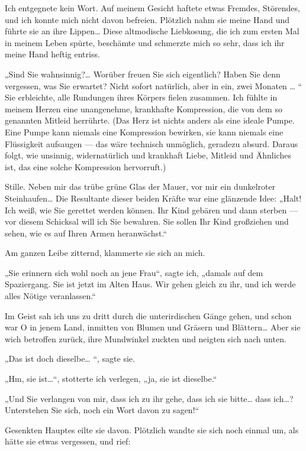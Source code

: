 Ich entgegnete kein Wort. Auf meinem Gesicht haftete etwas Fremdes,
Störendes, und ich konnte mich nicht davon befreien. Plötzlich nahm
sie meine Hand und führte sie an ihre Lippen\ldots{} Diese altmodische
Liebkosung, die ich zum ersten Mal in meinem Leben spürte,
beschämte und schmerzte mich so sehr, dass ich ihr meine Hand
heftig entriss.

„Sind Sie wahnsinnig?\ldots{} Worüber freuen Sie sich eigentlich? Haben
Sie denn vergessen, was Sie erwartet? Nicht sofort natürlich, aber
in ein, zwei Monaten \ldots{} “ Sie erbleichte, alle Rundungen ihres
Körpers fielen zusammen. Ich fühlte in meinem Herzen eine
unangenehme, krankhafte Kompression, die von dem so genannten
Mitleid herrührte. (Das Herz ist nichts anders als eine ideale
Pumpe. Eine Pumpe kann niemals eine Kompression bewirken, sie kann
niemals eine Flüssigkeit aufsaugen — das wäre technisch unmöglich,
geradezu absurd. Daraus folgt, wie unsinnig, widernatürlich und
krankhaft Liebe, Mitleid und Ähnliches ist, das eine solche
Kompression hervorruft.)

Stille. Neben mir das trübe grüne Glas der Mauer, vor mir ein
dunkelroter Steinhaufen\ldots{} Die Resultante dieser beiden Kräfte war
eine glänzende Idee: „Halt! Ich weiß, wie Sie gerettet werden
können. Ihr Kind gebären und dann sterben — vor diesem Schicksal
will ich Sie bewahren. Sie sollen Ihr Kind großziehen und sehen,
wie es auf Ihren Armen heranwächst.“

Am ganzen Leibe zitternd, klammerte sie sich an mich.

„Sie erinnern sich wohl noch an jene Frau“, sagte ich, „damals auf
dem Spaziergang. Sie ist jetzt im Alten
Haus. Wir gehen gleich zu ihr, und ich werde alles Nötige
veranlassen.“

Im Geist sah ich uns zu dritt durch die unterirdischen Gänge gehen,
und schon war O in jenem Land, inmitten von Blumen und Gräsern und
Blättern\ldots{} Aber sie wich betroffen zurück, ihre Mundwinkel zuckten
und neigten sich nach unten.

„Das ist doch dieselbe\ldots{} “, sagte sie.

„Hm, sie ist\ldots{}“, stotterte ich verlegen, „ja, sie ist dieselbe.“

„Und Sie verlangen von mir, dass ich zu ihr gehe, dass ich sie
bitte\ldots{} dass ich\ldots{}? Unterstehen Sie sich, noch ein Wort davon zu
sagen!“

Gesenkten Hauptes eilte sie davon. Plötzlich wandte sie sich noch
einmal um, als hätte sie etwas vergessen, und rief:

